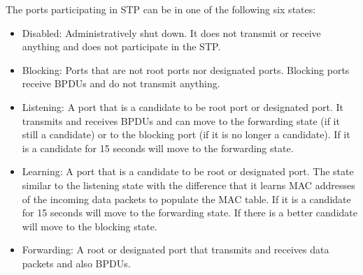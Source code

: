 The ports participating in STP can be in one of the following six states:
\begin{itemize}
\item Disabled: Administratively shut down. It does not transmit or receive anything and does not participate in the STP.
\item Blocking: Ports that are not root ports nor designated ports.
Blocking ports receive BPDUs and do not transmit anything.
\item Listening: A port that is a candidate to be root port or designated port. 
It transmits and receives BPDUs and can move to the forwarding state (if it still a candidate) or to the blocking port (if it is no longer a candidate).
If it is a candidate for 15 seconds will move to the forwarding state.
\item Learning: A port that is a candidate to be root or designated port.
The state similar to the listening state with the difference that it learns MAC addresses of the incoming data packets to populate the MAC table.
If it is a candidate for 15 seconds will move to the forwarding state.
If there is a better candidate will move to the blocking state.
\item Forwarding: A root or designated port that transmits and receives data packets and also BPDUs.
\end{itemize}


